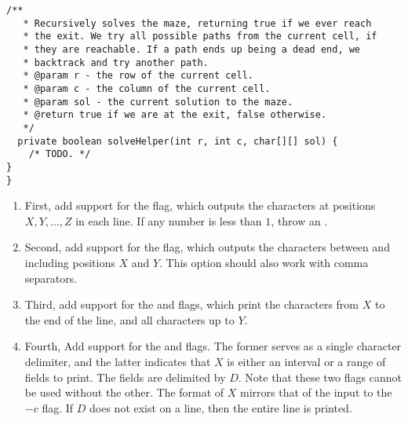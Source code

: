 \begin{enumerate}[label=(\alph*)]
\begin{lstlisting}[language=MyJava]
  /**
   * Recursively solves the maze, returning true if we ever reach
   * the exit. We try all possible paths from the current cell, if
   * they are reachable. If a path ends up being a dead end, we 
   * backtrack and try another path.
   * @param r - the row of the current cell.
   * @param c - the column of the current cell.
   * @param sol - the current solution to the maze.
   * @return true if we are at the exit, false otherwise.
   */
  private boolean solveHelper(int r, int c, char[][] sol) { 
    /* TODO. */ 
}
}
\end{lstlisting}
\end{enumerate}


\begin{enumerate}[label=(\alph*)]
    \item First, add support for the  flag, which outputs the characters at positions $X,Y,\ldots,Z$ in each line. If any number is less than $1$, throw an .
    \item Second, add support for the  flag, which outputs the characters between and including positions $X$ and $Y$. This option should also work with comma separators.
    \item Third, add support for the  and  flags, which print the characters from $X$ to the end of the line, and all characters up to $Y$.
    \item Fourth, Add support for the  and  flags. The former serves as a single character delimiter, and the latter indicates that $X$ is either an interval or a range of fields to print. The fields are delimited by $D$. Note that these two flags cannot be used without the other. The format of $X$ mirrors that of the input to the $-c$ flag. If $D$ does not exist on a line, then the entire line is printed.
\end{enumerate}


